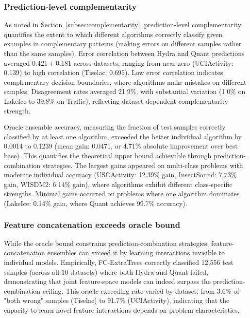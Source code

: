 \documentclass[pdflatex,sn-basic]{sn-jnl}           %
\theoremstyle{thmstyleone}%
\theoremstyle{thmstyletwo}%
\theoremstyle{thmstylethree}%
\begin{document}
\subsubsection{Prediction-level complementarity} 

As noted in Section~\ref{subsec:complementarity}, prediction-level complementarity quantifies the extent to which different algorithms correctly classify given examples in complementary patterns (making errors on different samples rather than the same samples). Error correlation between Hydra and Quant predictions averaged $0.421 \pm 0.181$ across datasets, ranging from near-zero (UCIActivity: 0.139) to high correlation (Tiselac: 0.695). Low error correlation indicates complementary decision boundaries, where algorithms make mistakes on different samples. Disagreement rates averaged 21.9\%, with substantial variation (1.0\% on LakeIce to 39.8\% on Traffic), reflecting dataset-dependent complementarity strength.

Oracle ensemble accuracy, measuring the fraction of test samples correctly classified by at least one algorithm, exceeded the better individual algorithm by 0.0014 to 0.1239 (mean gain: 0.0471, or 4.71\% absolute improvement over best base). This quantifies the theoretical upper bound achievable through prediction-combination strategies. The largest gains appeared on multi-class problems with moderate individual accuracy (USCActivity: 12.39\% gain, InsectSound: 7.73\% gain, WISDM2: 6.14\% gain), where algorithms exhibit different class-specific strengths. Minimal gains occurred on problems where one algorithm dominates (LakeIce: 0.14\% gain, where Quant achieves 99.7\% accuracy).

\subsubsection{Feature concatenation exceeds oracle bound}

While the oracle bound constrains prediction-combination strategies, feature-concatenation ensembles can exceed it by learning interactions invisible to individual models. Empirically, FC-ExtraTrees correctly classified 12,556 test samples (across all 10 datasets) where both Hydra and Quant failed, demonstrating that joint feature-space models can indeed surpass the prediction-combination ceiling. This oracle-exceeding rate varied by dataset, from 3.6\% of "both wrong" samples (Tiselac) to 91.7\% (UCIActivity), indicating that the capacity to learn novel feature interactions depends on problem characteristics.
\end{document}
